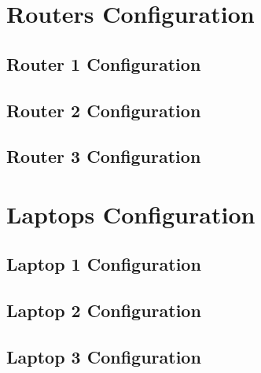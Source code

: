 \appendix

\begingroup

\chapter{Routers Configuration}
\label{app:routers}

\section{Router 1 Configuration}
\label{app:sec:router1}

\clearpage

\section{Router 2 Configuration}
\label{app:sec:router2}

\clearpage

\section{Router 3 Configuration}
\label{app:sec:router3}

\clearpage



\chapter{Laptops Configuration}
\label{app:laptops}

\section{Laptop 1 Configuration}
\label{app:sec:laptop1}
\clearpage

\section{Laptop 2 Configuration}
\label{app:sec:laptop2}
\clearpage

\section{Laptop 3 Configuration}
\label{app:sec:laptop3}

\endgroup
